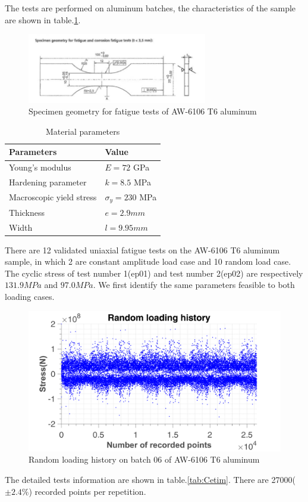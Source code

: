 \documentclass[3p,times,number,review]{elsarticle}
\begin{document}
The tests are performed on aluminum batches, the characteristics of the sample are shown in table.\ref{tab:cetim}.
\begin{figure}[!h]
\centering
\includegraphics[width=0.7\textwidth]{figures//aluminum_cetim.png} 
\caption{Specimen geometry for fatigue tests of AW-6106 T6 aluminum}
\label{fig:aluminum}
\end{figure}
\begin{table}[!h]
\centering
\begin{tabular}{ll}
\hline
\textbf{Parameters}                                         & \textbf{Value}                    \\ \hline
Young's modulus                                             & $E=72$ GPa                       \\
Hardening parameter                                         &  $k=8.5$ MPa \\
Macroscopic yield stress                                    & $\sigma_y=230$ MPa              \\
Thickness & $e=2.9mm$                        \\
Width		 & $l= 9.95mm$                        \\ \hline
\end{tabular}
\caption{Material parameters}
\label{tab:cetim}
\end{table}

There are 12 validated uniaxial fatigue tests on the AW-6106 T6 aluminum sample, in which 2 are constant amplitude load case and 10 random  load case. 
The cyclic stress of test number 1(ep01) and test number 2(ep02) are respectively $131.9MPa$ and $97.0MPa$. We first identify the same parameters feasible to both loading cases. 

\begin{figure}[!h]
\centering
\includegraphics[width=\textwidth]{figures//EP_a_06_random.png} 
\caption{Random loading history on batch 06 of AW-6106 T6 aluminum}
\end{figure}	
The detailed tests information are shown in table.\ref{tab:Cetim}. There are 27000($\pm 2.4\%$) recorded points per repetition. 
\end{document}
